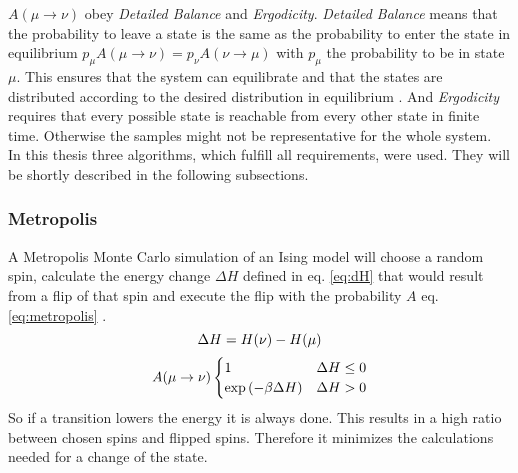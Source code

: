     \(A(\mu \to \nu)\) obey \emph{Detailed Balance} and \emph{Ergodicity}.
    \emph{Detailed Balance} means that the probability to leave a state is
    the same as the probability to enter the state in equilibrium
    \(p_\mu A(\mu \to \nu) = p_\nu A(\nu \to \mu)\) with \(p_\mu\) the
    probability to be in state \(\mu\). This ensures that the system can
    equilibrate and that the states are distributed according to the
    desired distribution in equilibrium \cite{NewmanBarkema1999}.
    And \emph{Ergodicity} requires that every possible state is reachable
    from every other state in finite time. \cite{NewmanBarkema1999} \cite{Katzgraber2011}
    Otherwise the samples might not be representative for the whole system.\\
    In this thesis three algorithms, which fulfill all requirements,
    were used. They will be shortly described in the following subsections.

    \subsubsection{Metropolis}
        A Metropolis Monte Carlo\cite{Metropolis1953} simulation of an
        Ising model will choose a random spin, calculate the energy change
        \(\Delta H\) defined in eq. \eqref{eq:dH} that would result
        from a flip of that spin and execute the flip with the probability \(A\)
        eq. \eqref{eq:metropolis} \cite{NewmanBarkema1999} \cite{Katzgraber2011}.
        \begin{equation}
            \Delta H = H(\nu) - H(\mu)\\
            \label{eq:dH}
        \end{equation}
        \begin{equation}
            A(\mu \to \nu)
            \begin{cases}
                1                            & \Delta H \le 0 \\
                \exp{\ensuremath{\left(-\beta \Delta H\right)}} & \Delta H > 0
            \end{cases}
            \label{eq:metropolis}
        \end{equation}
        So if a transition lowers the energy it is always done. This
        results in a high ratio between chosen spins and flipped spins.
        Therefore it minimizes the calculations needed for a change of
        the state.

